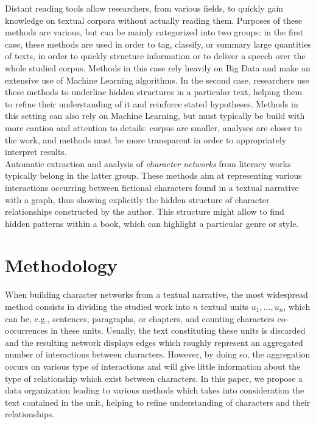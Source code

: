 \documentclass[
twocolumn,
]{ceurart}
\begin{document}
Distant reading tools allow researchers, from various fields, to quickly gain knowledge on textual corpora without actually reading them. Purposes of these methods are various, but can be mainly categorized into two groups: in the first case, these methods are used in order to tag, classify, or summary large quantities of texts, in order to quickly structure information or to deliver a speech over the whole studied corpus. Methods in this case rely heavily on Big Data and make an extensive use of Machine Learning algorithms. In the second case, researchers use these methods to underline hidden structures in a particular text, helping them to refine their understanding of it and reinforce stated hypotheses. Methods in this setting can also rely on Machine Learning, but must typically be build with more caution and attention to details: corpus are smaller, analyses are closer to the work, and methods must be more transparent in order to appropriately interpret results. \\
Automatic extraction and analysis of \emph{character networks} from literacy works typically belong in the latter group. These methods aim at representing various interactions occurring between fictional characters found in a textual narrative with a graph, thus showing explicitly the hidden structure of character relationships constructed by the author. This structure might allow to find hidden patterns within a book, which can highlight a particular genre or style.

\section{Methodology}


When building character networks from a textual narrative, the most widespread method consists in dividing the studied work into $n$ textual units $u_1, \ldots, u_n$, which can be, e.g., sentences, paragraphs, or chapters, and counting characters co-occurrences in these units. Usually, the text constituting these units is discarded and the resulting network displays edges which roughly represent an aggregated number of interactions between characters. However, by doing so, the aggregation occurs on various type of interactions and will give little information about the type of relationship which exist between characters. In this paper, we propose a data organization leading to various methods which takes into consideration the text contained in the unit, helping to refine understanding of characters and their relationships.
\end{document}
